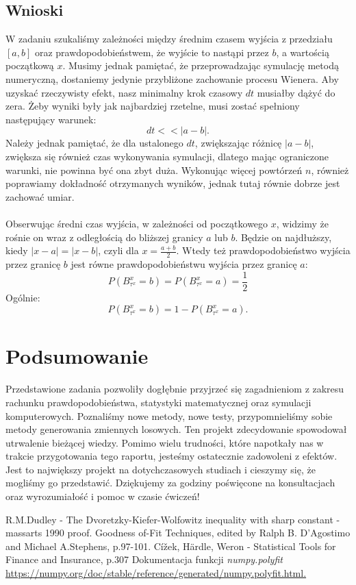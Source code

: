 \documentclass{article}
\theoremstyle{break}
\numberwithin{equation}{subsection}
\numberwithin{figure}{section}
\begin{document}
\subsection*{Wnioski}
W zadaniu szukaliśmy zależności między średnim czasem wyjścia z przedziału $[a,b]$ oraz prawdopodobieństwem, że wyjście to nastąpi przez $b$, a wartością początkową $x$. Musimy jednak pamiętać, że przeprowadzając symulację metodą numeryczną, dostaniemy jedynie przybliżone zachowanie procesu Wienera. Aby uzyskać rzeczywisty efekt, nasz minimalny krok czasowy $dt$ musiałby dążyć do zera. Żeby wyniki były jak najbardziej rzetelne, musi zostać spełniony następujący warunek:
 $$dt<<|a-b|.$$ 
Należy jednak pamiętać, że dla ustalonego $dt$, zwiększając różnicę $|a-b|$, zwiększa się również czas wykonywania symulacji, dlatego mając ograniczone warunki, nie powinna być ona zbyt duża. Wykonując więcej powtórzeń $n$, również poprawiamy dokładność otrzymanych wyników, jednak tutaj równie dobrze jest zachować umiar.
\\ \\
Obserwując średni czas wyjścia, w zależności od początkowego $x$, widzimy że rośnie on wraz z odległością do bliższej granicy $a$ lub $b$. Będzie on najdłuższy, kiedy $|x-a|=|x-b|$, czyli dla $x=\frac{a+b}{2}$. Wtedy też prawdopodobieństwo wyjścia przez granicę $b$ jest równe prawdopodobieństwu wyjścia przez granicę $a$:
 $$P(B_{\tau^x}^x=b) = P(B_{\tau^x}^x=a) = \frac{1}{2}$$
Ogólnie:
 $$P(B_{\tau^x}^x=b) = 1 - P(B_{\tau^x}^x=a).$$

\section{Podsumowanie}

Przedstawione zadania pozwoliły dogłębnie przyjrzeć się zagadnieniom z zakresu rachunku prawdopodobieństwa, statystyki matematycznej oraz symulacji komputerowych. Poznaliśmy nowe metody, nowe testy, przypomnieliśmy sobie metody generowania zmiennych losowych. Ten projekt zdecydowanie spowodował utrwalenie bieżącej wiedzy. Pomimo wielu trudności, które napotkały nas w trakcie przygotowania tego raportu, jesteśmy ostatecznie zadowoleni z efektów. Jest to największy projekt na dotychczasowych studiach i cieszymy się, że mogliśmy go przedstawić. Dziękujemy za godziny poświęcone na konsultacjach oraz wyrozumiałość i pomoc w czasie ćwiczeń!

\begin{thebibliography}{9}

 R.M.Dudley - The Dvoretzky-Kiefer-Wolfowitz inequality with sharp constant - massarts 1990 proof.
 Goodness of-Fit Techniques, edited by Ralph B. D'Agostimo and Michael A.Stephens, p.97-101.
 Cížek, Härdle, Weron - Statistical Tools for Finance and Insurance, p.307
 Dokumentacja funkcji \emph{numpy.polyfit} \url{https://numpy.org/doc/stable/reference/generated/numpy.polyfit.html.}

\end{thebibliography}
\end{document}
